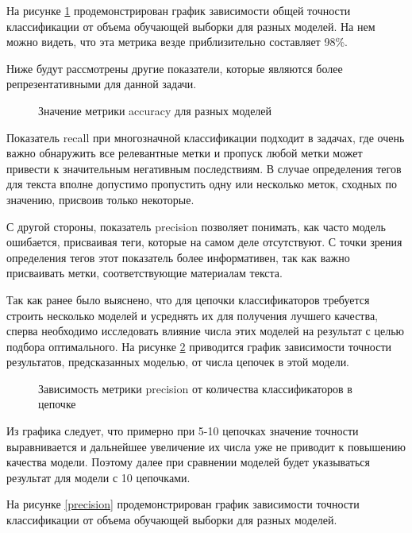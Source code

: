 \documentclass[a4paper, 12pt]{article}
\begin{document}
\begin{large}
На рисунке \ref{accuracy} продемонстрирован график зависимости общей точности классификации от объема обучающей выборки для разных моделей.
На нем можно видеть, что эта метрика везде приблизительно составляет 98\%.

Ниже будут рассмотрены другие показатели, которые являются более репрезентативными для данной задачи.
\newpage

\begin{figure}[h!]
    \captionsetup{justification=centering}
    \caption{Значение метрики accuracy для разных моделей}
    \label{accuracy}
\end{figure}

Показатель recall при многозначной классификации подходит в задачах, где очень важно обнаружить все релевантные метки и пропуск любой метки может привести к значительным негативным последствиям.
В случае определения тегов для текста вполне допустимо пропустить одну или несколько меток, сходных по значению, присвоив только некоторые. 

С другой стороны, показатель precision позволяет понимать, как часто модель ошибается, присваивая теги, которые на самом деле отсутствуют.
С точки зрения определения тегов этот показатель более информативен, так как важно присваивать метки, соответствующие материалам текста. 

Так как ранее было выяснено, что для цепочки классификаторов требуется строить несколько моделей и усреднять их для получения лучшего качества, сперва необходимо исследовать влияние числа этих моделей на результат с целью подбора оптимального.
На рисунке \ref{chains} приводится график зависимости точности результатов, предсказанных моделью, от числа цепочек в этой модели.
\newpage
\begin{figure}[h!]
    \captionsetup{justification=centering}
    \caption{Зависимость метрики precision от количества классификаторов в цепочке}
    \label{chains}
\end{figure}

Из графика следует, что примерно при 5-10 цепочках значение точности выравнивается и дальнейшее увеличение их числа уже не приводит к повышению качества модели.
Поэтому далее при сравнении моделей будет указываться результат для модели с 10 цепочками.

На рисунке \ref{precision} продемонстрирован график зависимости точности классификации от объема обучающей выборки для разных моделей.


\end{large}
\end{document}
